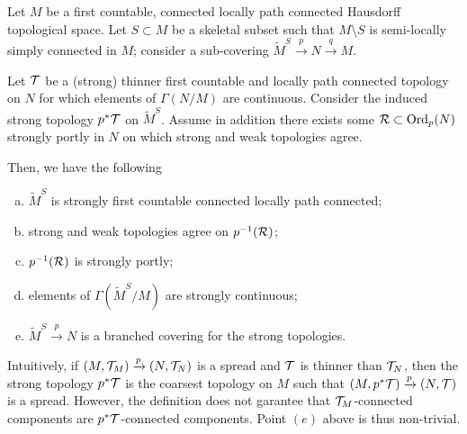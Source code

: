 \begin{lem} \label{lem:spread_top} Let $M$ be a first countable, connected locally path connected Hausdorff topological space. Let $S\subset M$ be a skeletal subset such that $M\setminus S$ is semi-locally simply connected in $M$;
consider a sub-covering $\widetilde M^S\xrightarrow{p}N\xrightarrow{q}M$.

Let $\mathcal{T}$ be a (strong) thinner first countable and locally path connected topology on $N$ for which elements of $\Gamma(N/M)$ are continuous. Consider the induced strong topology $p^*\mathcal{T}$ on $\widetilde M^S$.
Assume in addition there exists some $\mathcal R \subset \mathrm{Ord}_p(N)$ strongly portly  in $N$ on which strong and weak topologies agree.

 Then, we have the following
 \begin{enumerate}[(a)]
 \item $\widetilde M^S$ is strongly first countable connected locally path connected;
 \item strong and weak topologies agree on $p^{-1}(\mathcal R)$; 
 \item $p^{-1}(\mathcal R)$ is strongly portly;
  \item elements of $\Gamma(\widetilde M^S/M)$ are  strongly continuous;
  \item $\widetilde M^S\xrightarrow{p}N$ is a branched covering for the strong
  topologies.
  \end{enumerate}
\end{lem}
\begin{rem}
 Intuitively, if $(M,\mathcal{T}_M)\xrightarrow{p}(N,\mathcal{T}_N)$ is a spread and $\mathcal{T}$ is thinner than $\mathcal{T}_N$, then the strong topology $p^*\mathcal{T}$ is the coarsest topology on $M$ such that $(M,p^*\mathcal{T})\xrightarrow{p}(N,\mathcal{T})$ is a spread. However, the definition does not garantee that $\mathcal{T}_M$-connected components are $p^*\mathcal{T}$-connected components. Point $(e)$ above is thus non-trivial.
\end{rem}

